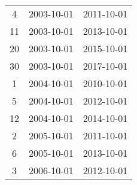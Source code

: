 \begin{tabular}{ccc}
  4 & 2003-10-01 & 2011-10-01 \\ 
  11 & 2003-10-01 & 2013-10-01 \\ 
  20 & 2003-10-01 & 2015-10-01 \\ 
  30 & 2003-10-01 & 2017-10-01 \\ 
  1 & 2004-10-01 & 2010-10-01 \\ 
  5 & 2004-10-01 & 2012-10-01 \\ 
  12 & 2004-10-01 & 2014-10-01 \\ 
  2 & 2005-10-01 & 2011-10-01 \\ 
  6 & 2005-10-01 & 2013-10-01 \\ 
  3 & 2006-10-01 & 2012-10-01 \\ 
   \hline
\end{tabular}
